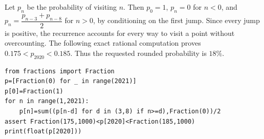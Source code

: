 Let $p_n$ be the probability of visiting $n$. Then $p_0=1$, $p_n=0$ for $n<0$, and $p_n=\dfrac{p_{n-3}+p_{n-8}}{2}$ for $n>0$, by conditioning on the first jump. Since every jump is positive, the recurrence accounts for every way to visit a point without overcounting. The following exact rational computation proves $0.175<p_{2020}<0.185$. Thus the requested rounded probability is $\boxed{18\%}$.
\begin{verbatim}
from fractions import Fraction
p=[Fraction(0) for _ in range(2021)]
p[0]=Fraction(1)
for n in range(1,2021):
    p[n]=sum((p[n-d] for d in (3,8) if n>=d),Fraction(0))/2
assert Fraction(175,1000)<p[2020]<Fraction(185,1000)
print(float(p[2020]))
\end{verbatim}

